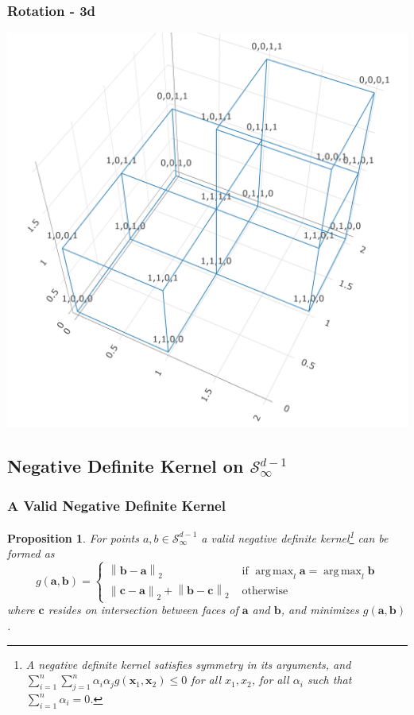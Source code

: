 \documentclass[aspectratio=169]{beamer}
\newcommand{\norm}[1]{\left\lVert #1 \right\rVert}
\newcommand{\pnorm}[2]{\norm{#1}_{#2}}
\newtheorem{prop}{Proposition}
\DeclareMathOperator*{\argmax}{arg\,max}
\newlength{\frametextheight}
\begin{document}
\begin{frame}
    \frametitle{Rotation - 3d}
    \begin{center}
        \includegraphics[height=\frametextheight]{./images/rot_4d_3d}
    \end{center}
\end{frame}

\subsection{Negative Definite Kernel on $\mathcal{S}_{\infty}^{d-1}$}
\begin{frame}
  \frametitle{A Valid Negative Definite Kernel}
  \begin{prop}
    For points $a,b \in \mathcal{S}_{\infty}^{d-1}$ a valid negative definite kernel\footnote{A negative definite kernel satisfies symmetry in its arguments, and $\sum_{i = 1}^n\sum_{j = 1}^n \alpha_i\alpha_j g(\bm{x}_1,\bm{x}_2) \leq 0$ for all $x_1,x_2$, for all $\alpha_i$ such that $\sum_{i = 1}^n\alpha_i = 0$.} can be formed as
    \begin{equation*}
      g(\bm{a},\bm{b}) = \begin{cases}
        \pnorm{\bm{b}-\bm{a}}{2} &\text{ if }\argmax_l\bm{a} = \argmax_l\bm{b}\\
        \pnorm{\bm{c}-\bm{a}}{2} + \pnorm{\bm{b}-\bm{c}}{2} &\text{ otherwise}
      \end{cases}
    \end{equation*}
    where $\bm{c}$ resides on intersection between faces of $\bm{a}$ and $\bm{b}$, and
                minimizes $g(\bm{a},\bm{b})$.
  \end{prop}
\end{frame}
\end{document}
